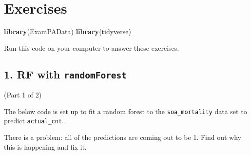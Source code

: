 \documentclass[openany]{book}
\newenvironment{Shaded}{\begin{snugshade}}{\end{snugshade}}
\newcommand{\CommentTok}[1]{\textcolor[rgb]{0.56,0.35,0.01}{\textit{#1}}}
\newcommand{\DataTypeTok}[1]{\textcolor[rgb]{0.13,0.29,0.53}{#1}}
\newcommand{\DecValTok}[1]{\textcolor[rgb]{0.00,0.00,0.81}{#1}}
\newcommand{\FloatTok}[1]{\textcolor[rgb]{0.00,0.00,0.81}{#1}}
\newcommand{\KeywordTok}[1]{\textcolor[rgb]{0.13,0.29,0.53}{\textbf{#1}}}
\newcommand{\NormalTok}[1]{#1}
\newcommand{\OperatorTok}[1]{\textcolor[rgb]{0.81,0.36,0.00}{\textbf{#1}}}
\newcommand{\StringTok}[1]{\textcolor[rgb]{0.31,0.60,0.02}{#1}}
\begin{document}
\hypertarget{exercises-1}{%
\section{Exercises}\label{exercises-1}}

\begin{Shaded}
\begin{Highlighting}[]
\KeywordTok{library}\NormalTok{(ExamPAData)}
\KeywordTok{library}\NormalTok{(tidyverse)}
\end{Highlighting}
\end{Shaded}

Run this code on your computer to answer these exercises.

\hypertarget{rf-with-randomforest}{%
\subsection{\texorpdfstring{1. RF with \texttt{randomForest}}{1. RF with randomForest}}\label{rf-with-randomforest}}

(Part 1 of 2)

The below code is set up to fit a random forest to the \texttt{soa\_mortality} data set to predict \texttt{actual\_cnt}.

There is a problem: all of the predictions are coming out to be 1. Find out why this is happening and fix it.

\begin{Shaded}
\end{Shaded}
\end{document}
